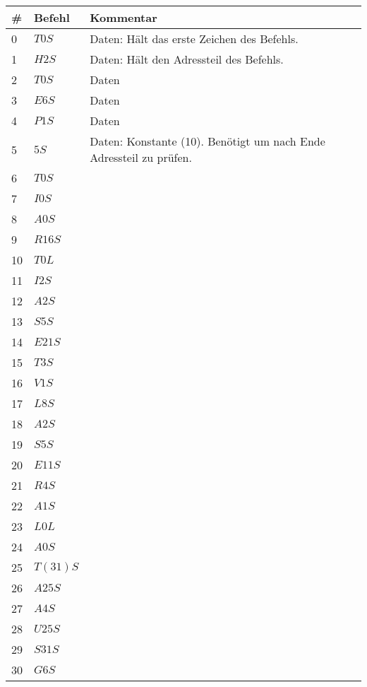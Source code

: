\documentclass[12pt]{report}
\begin{document}
\begin{table}
  \begin{tabular}{|l|l|p{5cm}|}
    \hline
      \# & Befehl & Kommentar \\
    \hline
      0 & $T0S$ & Daten: Hält das erste Zeichen des Befehls.\\ \hline
      1 & $H2S$ & Daten: Hält den Adressteil des Befehls.\\ \hline
      2 & $T0S$ & Daten\\ \hline
      3 & $E6S$ & Daten\\ \hline
      4 & $P1S$ & Daten\\ \hline
    5 & $ 5S$ & Daten: Konstante (10). Benötigt um nach Ende Adressteil zu prüfen.\\ \hline
    6 & $T0S$ &\\ \hline
    7 & $I0S$ &\\ \hline
    8 & $A0S$ &\\ \hline
    9 & $R16S$ &\\ \hline
    10 & $T0L$ &\\ \hline
    11 & $I2S$ &\\ \hline
    12 & $A2S$ &\\ \hline
    13 & $S5S$ &\\ \hline
    14 & $E21S$ &\\ \hline
    15 & $T3S$ &\\ \hline
    16 & $V1S$ &\\ \hline
    17 & $L8S$ &\\ \hline
    18 & $A2S$ &\\ \hline
    19 & $S5S$ &\\ \hline
    20 & $E11S$ &\\ \hline
    21 & $R4S$ &\\ \hline
    22 & $A1S$ &\\ \hline
    23 & $L0L$ &\\ \hline
    24 & $A0S$ &\\ \hline
    25 & $T(31)S$ &\\ \hline
    26 & $A25S$ &\\ \hline
    27 & $A4S$ &\\ \hline
    28 & $U25S$ &\\ \hline
    29 & $S31S$ &\\ \hline
    30 & $G6S$ &\\ \hline
  \end{tabular}
\end{table}

  

~\cite{theedsac}

\nocite{neumann,neumann1void,neumann2void,neumann3,neumann4}



\end{document}
